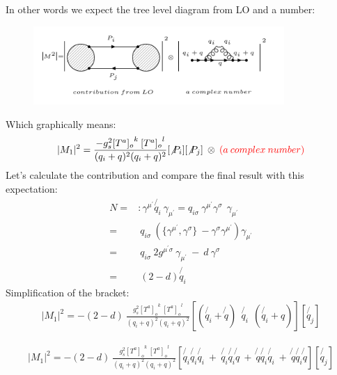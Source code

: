 In other words we expect the tree level diagram from LO and a number:\\
\begin{figure}[h!]
\centering
\includegraphics[width=0.85\textwidth]{images/QQ/expectationqg-qbar.png}
\end{figure}
Which graphically means:\\
\begin{equation}
\begin{split}
|M_1|^2=\frac{-g_s^2  {[T^a]_{o}}^k \: {[T^a]_o}^l }{(q_i + q)^2 (q_i + q)^2}
[\not{P_i}]
[\not{P_j}]\:\otimes \: {\color[RGB]{255,0,0} (a\: complex\: number)}
\end{split}
\end{equation}  
Let's calculate the contribution and compare the final result with this expectation:
\begin{equation}
\begin{split}
N=&: \gamma^{{\mu}^{\prime}} \not{q_i} \: \gamma_{{\mu}^{\prime}} = {q_{i\sigma}} \: \gamma^{{\mu}^{\prime}} \gamma^{\sigma} \:\: \gamma_{{\mu}^{\prime}}\\
=& \: {q_{i\sigma}} \: (\lbrace{\gamma^{{\mu}^{\prime}}}, {\gamma^{\sigma}}\rbrace \: - {\gamma^{\sigma}}{\gamma^{{\mu}^{\prime}}})\gamma_{{\mu}^{\prime}}\\
=& \:{q_{i\sigma}} \: 2g^{{{\mu}^{\prime}}{\sigma}} \: \gamma_{{\mu}^{\prime}} \: - \:d\:{\gamma^{\sigma}}\\
=& \:(2-d) \not{q_i}
\end{split}
\end{equation}
Simplification of the bracket:
\begin{equation}
\begin{split}
|M_1|^2=-(2-d)\:\frac{g_s^2  {[T^a]_{o}}^k \: {[T^a]_o}^l }{(q_i + q)^2 (q_i + q)^2}
[(\not{q_i} + \not{q}) \:
 \:\not{q_i} \: 
 \: (\not{q_i} + q)]
[\not{q_j}]
\end{split}
\end{equation}

\begin{equation}
\begin{split}
|M_1|^2=-(2-d)\:\frac{g_s^2  {[T^a]_{o}}^k \: {[T^a]_o}^l }{(q_i + q)^2 (q_i + q)^2}
[\not{q_i} \not{q_i} \not{q_i} \: + \: \not{q_i} \not{q_i} \not{q} \: + \: \not{q} \not{q_i} \not{q_i} \:+\: \not{q} \not{q_i} \not{q}]
[\not{q_j}]
\end{split}
\end{equation}

